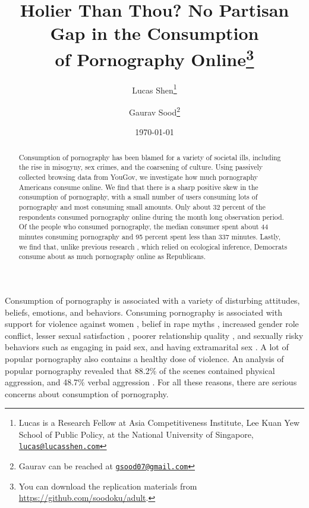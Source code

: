 \documentclass[12pt, letterpaper]{article}
\title{\Large{Holier Than Thou? No Partisan Gap in the Consumption\\ of Pornography Online}\footnote{You can download the replication materials from \href{http://github.com/soodoku/adult}{https://github.com/soodoku/adult}.
	}
}
\author{Lucas Shen\thanks{Lucas is a Research Fellow at Asia Competitiveness Institute, Lee Kuan Yew School of Public Policy, at the National University of Singapore, \href{mailto:lucas@lucasshen.com}{\footnotesize{\texttt{lucas@lucasshen.com}}}} \and Gaurav Sood\thanks{Gaurav can be reached at \href{mailto:gsood07@gmail.com}{\footnotesize{\texttt{gsood07@gmail.com}}}}\vspace{.5cm}}
\date{\today}
\begin{document}
\maketitle

\thispagestyle{empty}
\begin{abstract}
\noindent Consumption of pornography has been blamed for a variety of societal ills, including the rise in misogyny, sex crimes, and the coarsening of culture. Using passively collected browsing data from YouGov, we investigate how much pornography Americans consume online. We find that there is a sharp positive skew in the consumption of pornography, with a small number of users consuming lots of pornography and most consuming small amounts. Only about 32 percent of the respondents consumed pornography online during the month long observation period. Of the people who consumed pornography, the median consumer spent about 44 minutes  consuming pornography and 95 percent spent less than 337 minutes. Lastly, we find that, unlike previous research \citep{macinnis2015american, edelman2009markets}, which relied on ecological inference, Democrats consume about as much pornography online as Republicans.
\end{abstract} 
\clearpage
\setcounter{page}{1}
\doublespace

Consumption of pornography is associated with a variety of disturbing attitudes, beliefs, emotions, and behaviors. Consuming pornography is associated with support for violence against women \citep{hald2010pornography, malamuth2012pornography, donnerstein1984pornography}, belief in rape myths \citep{foubert2011pornography}, increased gender role conflict, lesser sexual satisfaction \citep{szymanski2014psychological, stewart2012young}, poorer relationship quality \citep{szymanski2014psychological, szymanski2015male}, and sexually risky behaviors such as engaging in paid sex, and having extramarital sex \citep{wright2012internet}. A lot of popular pornography also contains a healthy dose of violence. An analysis of popular pornography revealed that 88.2\% of the scenes contained physical aggression, and 48.7\% verbal aggression \citep{bridges2010aggression}. For all these reasons, there are serious concerns about consumption of pornography.
\end{document}
